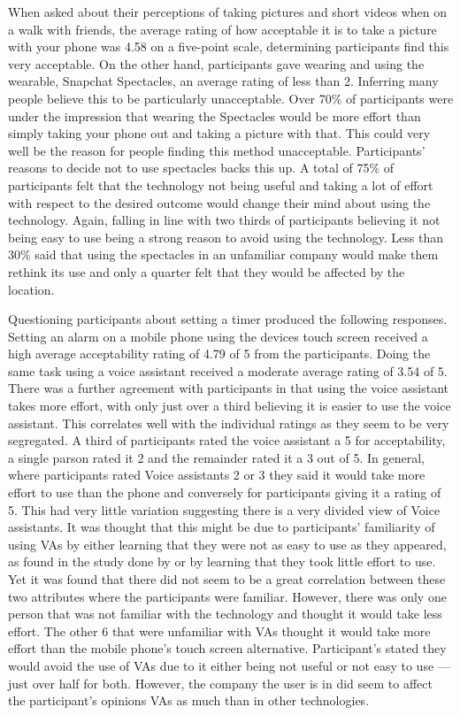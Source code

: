 \documentclass{l4proj}
\begin{document}
When asked about their perceptions of taking pictures and short videos when on a walk with friends, the average rating of how acceptable it is to take a picture with your phone was 4.58 on a five-point scale, determining participants find this very acceptable. On the other hand, participants gave wearing and using the wearable, Snapchat Spectacles, an average rating of less than 2. Inferring many people believe this to be particularly unacceptable. Over 70\% of participants were under the impression that wearing the Spectacles would be more effort than simply taking your phone out and taking a picture with that. This could very well be the reason for people finding this method unacceptable. Participants’ reasons to decide not to use spectacles backs this up. A total of 75\% of participants felt that the technology not being useful and taking a lot of effort with respect to the desired outcome would change their mind about using the technology. Again, falling in line with two thirds of participants believing it not being easy to use being a strong reason to avoid using the technology. Less than 30\% said that using the spectacles in an unfamiliar company would make them rethink its use and only a quarter felt that they would be affected by the location. 

Questioning participants about setting a timer produced the following responses. Setting an alarm on a mobile phone using the devices touch screen received a high average acceptability rating of 4.79 of 5 from the participants. Doing the same task using a voice assistant received a moderate average rating of 3.54 of 5. There was a further agreement with participants in that using the voice assistant takes more effort, with only just over a third believing it is easier to use the voice assistant. This correlates well with the individual ratings as they seem to be very segregated. A third of participants rated the voice assistant a 5 for acceptability, a single parson rated it 2 and the remainder rated it a 3 out of 5. In general, where participants rated Voice assistants 2 or 3 they said it would take more effort to use than the phone and conversely for participants giving it a rating of 5. This had very little variation suggesting there is a very divided view of Voice assistants. It was thought that this might be due to participants' familiarity of using VAs by either learning that they were not as easy to use as they appeared, as found in the study done by \citet{myers_patterns_2018} or by learning that they took little effort to use. Yet it was found that there did not seem to be a great correlation between these two attributes where the participants were familiar. However, there was only one person that was not familiar with the technology and thought it would take less effort. The other 6 that were unfamiliar with VAs thought it would take more effort than the mobile phone's touch screen alternative. Participant’s stated they would avoid the use of VAs due to it either being not useful or not easy to use --- just over half for both. However, the company the user is in did seem to affect the participant's opinions VAs as much than in other technologies.
\end{document}
